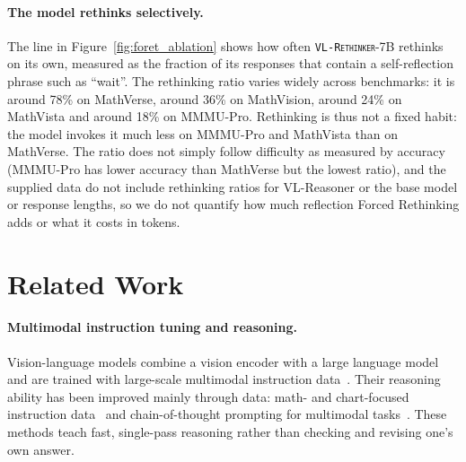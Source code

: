 \documentclass{article}
\newcommand{\model}{\texttt{\textsc{VL-Rethinker}}\xspace}
\begin{document}
\paragraph{The model rethinks selectively.} The line in Figure~\ref{fig:foret_ablation} shows how often \model-7B rethinks on its own, measured as the fraction of its responses that contain a self-reflection phrase such as ``wait''. The rethinking ratio varies widely across benchmarks: it is around 78\% on MathVerse, around 36\% on MathVision, around 24\% on MathVista and around 18\% on MMMU-Pro. Rethinking is thus not a fixed habit: the model invokes it much less on MMMU-Pro and MathVista than on MathVerse. The ratio does not simply follow difficulty as measured by accuracy (MMMU-Pro has lower accuracy than MathVerse but the lowest ratio), and the supplied data do not include rethinking ratios for VL-Reasoner or the base model or response lengths, so we do not quantify how much reflection Forced Rethinking adds or what it costs in tokens.

\section{Related Work}
\label{sec:related}

\paragraph{Multimodal instruction tuning and reasoning.} Vision-language models combine a vision encoder with a large language model and are trained with large-scale multimodal instruction data~\cite{llava,liu2023visualinstructiontuning,instructblip,minigpt4,li2023blip2bootstrappinglanguageimagepretraining,qwen2vl,qwen2_5_vl,internvl_2_5,llavaov,deepseekvl2,molmo,tong2024cambrian1fullyopenvisioncentric}. Their reasoning ability has been improved mainly through data: math- and chart-focused instruction data~\cite{gllava,shi2024mathllavabootstrappingmathematicalreasoning,mammothvl,visualwebinstruct,infinity-mm,gu2024infinity} and chain-of-thought prompting for multimodal tasks~\cite{mitra2024compositionalchainofthoughtpromptinglarge,luan2024textcotzoomenhancedmultimodal}. These methods teach fast, single-pass reasoning rather than checking and revising one's own answer.
\end{document}

